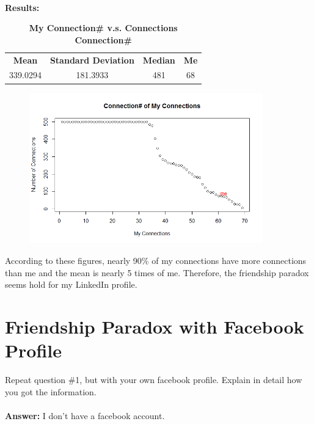 \documentclass{article}
\begin{document}
		\noindent\\\textbf{Results:}
		\begin{table}[!htb]
			\centering
			\caption{\textbf{My Connection\# v.s. Connections Connection\#}}
			\begin{tabular}{cccc}
				\toprule
				\textbf{Mean} & \textbf{Standard Deviation} & \textbf{Median} & \textbf{Me}\\
				339.0294 & 181.3933 & 481 & 68\\
				\bottomrule
			\end{tabular}
		\end{table}
		\begin{figure}[!htb]
			\centering 
			\href{https://github.com/zhangboroy/cs532-s17/blob/master/assg04_submission/linkedinConnections.png}
			{\includegraphics[width=0.9\textwidth]{linkedinConnections.png}}
			\label{fig:LinkedinConnections} 
		\end{figure}

		According to these figures, nearly 90\% of my connections have more connections than me and the mean is nearly 5 times of me. Therefore, the friendship paradox seems hold for my LinkedIn profile.\\
		\section{Friendship Paradox with Facebook Profile}
		Repeat question \#1, but with your own facebook profile. Explain in detail how you got the information.\\\\
		\textbf{Answer: }I don't have a facebook account.\\
\end{document}
